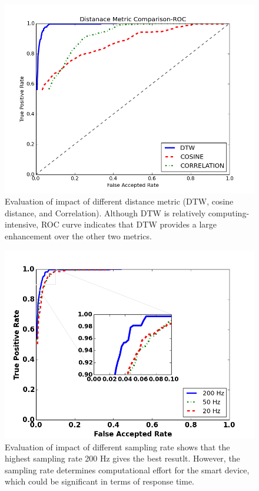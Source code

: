 \begin{figure}
\includegraphics[width=\columnwidth]{figure/roc_dtw_cos_cor.png}
\caption{\label{fig:roc_dtw_cos_cor} Evaluation of impact of different distance metric (DTW, cosine distance, and Correlation). Although DTW is relatively computing-intensive, ROC curve indicates  that DTW provides a large enhancement over the other two metrics. }
\end{figure}

\begin{figure}
\includegraphics[width=\columnwidth]{figure/roc_dtw_diff_freq.png}
\caption{\label{fig:roc_dtw_diff_freq} Evaluation of impact of different sampling rate shows that the highest sampling rate 200 Hz gives the best resutlt. However, the sampling rate determines computational effort for the smart device, which could be significant in terms of response time.}
\end{figure}

